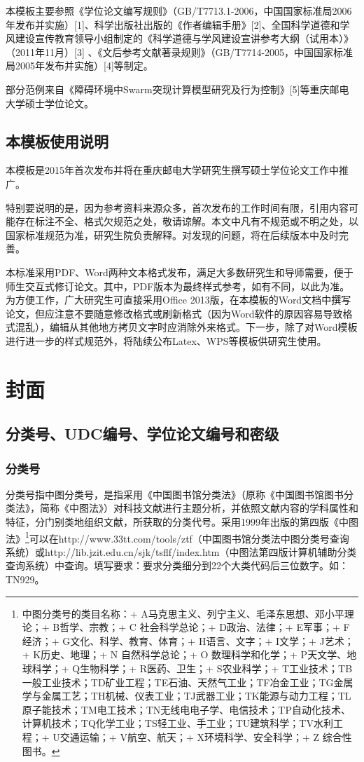 \documentclass{cqupt_thesis}
\begin{document}
    本模板主要参照《学位论文编写规则》（GB/T7713.1-2006，中国国家标准局2006年发布并实施）[1]、科学出版社出版的《作者编辑手册》[2]、全国科学道德和学风建设宣传教育领导小组制定的《科学道德与学风建设宣讲参考大纲（试用本）》（2011年11月）[3] 、《文后参考文献著录规则》（GB/T7714-2005，中国国家标准局2005年发布并实施）[4]等制定。

    部分范例来自《障碍环境中Swarm突现计算模型研究及行为控制》[5]等重庆邮电大学硕士学位论文。

    \subsection{本模板使用说明}
    本模板是2015年首次发布并将在重庆邮电大学研究生撰写硕士学位论文工作中推广。

    特别要说明的是，因为参考资料来源众多，首次发布的工作时间有限，引用内容可能存在标注不全、格式欠规范之处，敬请谅解。本文中凡有不规范或不明之处，以国家标准规范为准，研究生院负责解释。对发现的问题，将在后续版本中及时完善。

    本标准采用PDF、Word两种文本格式发布，满足大多数研究生和导师需要，便于师生交互式修订论文。其中，PDF版本为最终样式参考，如有不同，以此为准。为方便工作，广大研究生可直接采用Office 2013版，在本模板的Word文档中撰写论文，但应注意不要随意修改格式或刷新格式（因为Word软件的原因容易导致格式混乱），编辑从其他地方拷贝文字时应消除外来格式。下一步，除了对Word模板进行进一步的样式规范外，将陆续公布Latex、WPS等模板供研究生使用。


    \section{封面}

    \subsection{分类号、UDC编号、学位论文编号和密级}

    \subsubsection{分类号}
    分类号指中图分类号，是指采用《中国图书馆分类法》（原称《中国图书馆图书分类法》，简称《中图法》）对科技文献进行主题分析，并依照文献内容的学科属性和特征，分门别类地组织文献，所获取的分类代号。采用1999年出版的第四版《中图法》\footnote{
        中图分类号的类目名称：+ A马克思主义、列宁主义、毛泽东思想、邓小平理论；+ B哲学、宗教；+ C 社会科学总论；+ D政治、法律；+ E军事；+ F经济；+ G文化、科学、教育、体育；+ H语言、文字；+ I文学；+ J艺术；+ K历史、地理；+ N 自然科学总论；+ O 数理科学和化学；+ P天文学、地球科学；+ Q生物科学；+ R医药、卫生；+ S农业科学；+ T工业技术；TB一般工业技术；TD矿业工程；TE石油、天然气工业；TF冶金工业；TG金属学与金属工艺；TH机械、仪表工业；TJ武器工业；TK能源与动力工程；TL原子能技术；TM电工技术；TN无线电电子学、电信技术；TP自动化技术、计算机技术；TQ化学工业；TS轻工业、手工业；TU建筑科学；TV水利工程；+ U交通运输；+ V航空、航天；+ X环境科学、安全科学；+ Z 综合性图书。}可以在http://www.33tt.com/tools/ztf（中国图书馆分类法中图分类号查询系统）或http://lib.jzit.edu.cn/sjk/tsflf/index.htm（中图法第四版计算机辅助分类查询系统）中查询。填写要求：要求分类细分到22个大类代码后三位数字。如：TN929。
\end{document}
